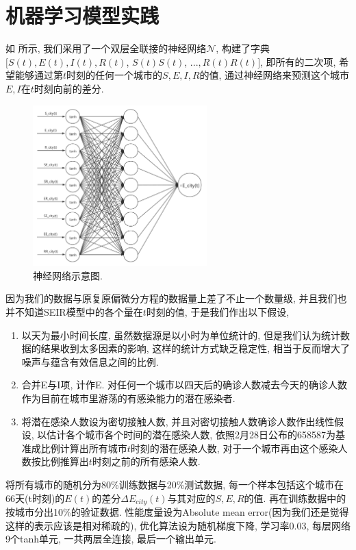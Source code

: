 \documentclass[lang=cn,11pt]{elegantpaper}
\begin{document}
\section{机器学习模型实践}

如 所示, 我们采用了一个双层全联接的神经网络$\mathcal N$, 构建了字典$[S(t),E(t),I(t),R(t)$, $S(t)S(t)$, $...,R(t)R(t)]$, 即所有的二次项, 希望能够通过第$t$时刻的任何一个城市的$S,E,I,R$的值, 通过神经网络来预测这个城市$E,I$在$t$时刻向前的差分. 

\begin{figure}[htbp]
  \centering
  \hspace{50pt}\includegraphics[width=0.6\textwidth]{sjwl}
  \caption{神经网络示意图. \label{fig:sjwl}}
\end{figure}

因为我们的数据与原复原偏微分方程的数据量上差了不止一个数量级, 并且我们也并不知道SEIR模型中的各个量在$t$时刻的值, 于是我们作出以下假设, 
\begin{enumerate}
	\item 以天为最小时间长度, 虽然数据源是以小时为单位统计的, 但是我们认为统计数据的结果收到太多因素的影响, 这样的统计方式缺乏稳定性, 相当于反而增大了噪声与蕴含有效信息之间的比例.
	\item 合并E与I项, 计作E. 对任何一个城市以四天后的确诊人数减去今天的确诊人数作为目前在城市里游荡的有感染能力的潜在感染者.
	\item 将潜在感染人数设为密切接触人数, 并且对密切接触人数确诊人数作出线性假设, 以估计各个城市各个时间的潜在感染人数, 依照2月28日公布的658587为基准成比例计算出所有城市$t$时刻的潜在感染人数, 对于一个城市再由这个感染人数按比例推算出$t$时刻之前的所有感染人数. 
\end{enumerate}

将所有城市的随机分为80\%训练数据与20\%测试数据, 每一个样本包括这个城市在66天(t时刻)的$E(t)$的差分$\Delta E_{city}(t)$与其对应的$S,E,R$的值. 再在训练数据中的按城市分出10\%的验证数据. 性能度量设为Absolute mean error(因为我们还是觉得这样的表示应该是相对稀疏的), 优化算法设为随机梯度下降, 学习率0.03, 每层网络9个tanh单元, 一共两层全连接, 最后一个输出单元.
\end{document}
